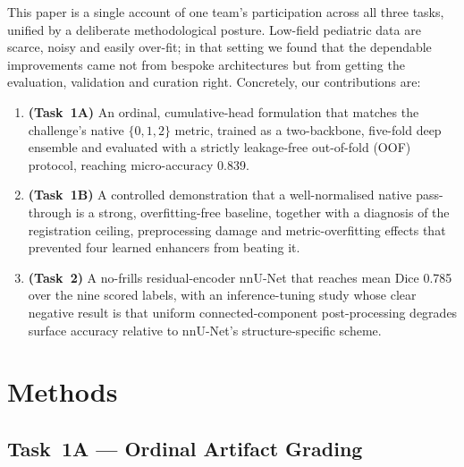 \documentclass[runningheads]{llncs}
\begin{document}
This paper is a single account of one team's participation across all three
tasks, unified by a deliberate methodological posture. Low-field pediatric data
are scarce, noisy and easily over-fit; in that setting we found that the
dependable improvements came not from bespoke architectures but from getting the
evaluation, validation and curation right. Concretely, our contributions are:
\begin{enumerate}
  \item \textbf{(Task~1A)} An ordinal, cumulative-head formulation that matches
        the challenge's native $\{0,1,2\}$ metric, trained as a two-backbone,
        five-fold deep ensemble and evaluated with a strictly leakage-free
        out-of-fold (OOF) protocol, reaching micro-accuracy 0.839.
  \item \textbf{(Task~1B)} A controlled demonstration that a well-normalised
        native pass-through is a strong, overfitting-free baseline, together with
        a diagnosis of the registration ceiling, preprocessing damage and
        metric-overfitting effects that prevented four learned enhancers from
        beating it.
  \item \textbf{(Task~2)} A no-frills residual-encoder nnU-Net that reaches mean
        Dice 0.785 over the nine scored labels, with an inference-tuning study
        whose clear negative result is that uniform connected-component
        post-processing degrades surface accuracy relative to nnU-Net's
        structure-specific scheme.
\end{enumerate}

\FloatBarrier
\section{Methods}
\label{sec:methods}

\subsection{Task~1A --- Ordinal Artifact Grading}
\label{sec:m1a}
\end{document}
